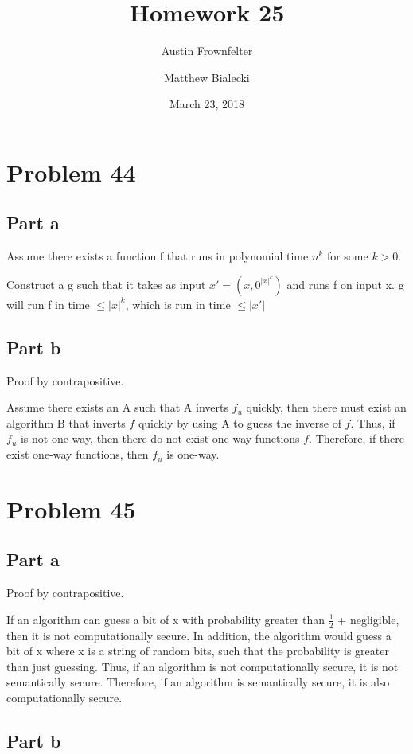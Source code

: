 \documentclass{article}
\title{Homework 25}
\author{Austin Frownfelter \and Matthew Bialecki}
\date{March 23, 2018}
\begin{document}
\maketitle

\section{Problem 44}
\subsection{Part a}

Assume there exists a function f that runs in polynomial time $n^k$ for some $k>0$.

Construct a g such that it takes as input $x'=(x,0^{|x|^k})$ and runs f on input x.  g will run f in time $\leq |x|^k$, which is run in time $\leq |x'|$

\subsection{Part b}
Proof by contrapositive.

Assume there exists an A such that A inverts $f_u$ quickly, then there must exist an algorithm B that inverts $f$ quickly by using A to guess the inverse of $f$.  Thus, if $f_u$ is not one-way, then there do not exist one-way functions $f$.  Therefore, if there exist one-way functions, then $f_u$ is one-way.

\section{Problem 45}

\subsection{Part a}
Proof by contrapositive.

If an algorithm can guess a bit of x with probability greater than $\frac12$ + negligible, then it is not computationally secure.  In addition, the algorithm would guess a bit of x where x is a string of random bits, such that the probability is greater than just guessing.  Thus, if an algorithm is not computationally secure, it is not semantically secure.  Therefore, if an algorithm is semantically secure, it is also computationally secure.

\subsection{Part b}
\end{document}
